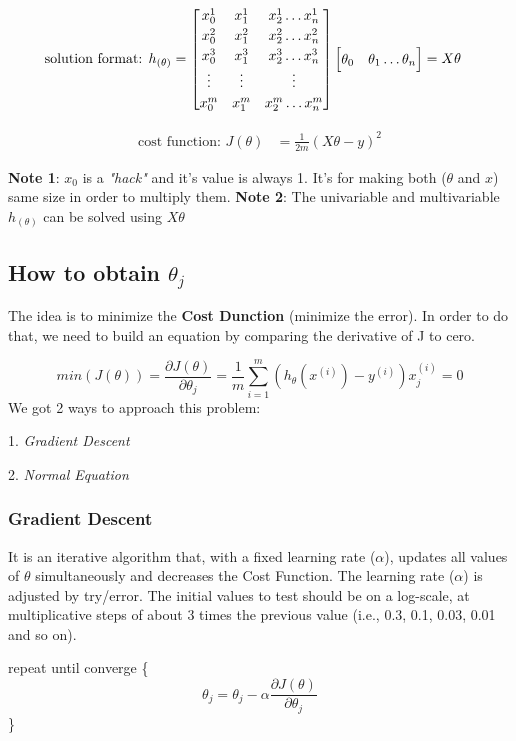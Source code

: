 \begin{align}
	\text{solution format: } h_{(\theta)} & = 
	\renewcommand\arraystretch{1.2}\begin{bmatrix}
			x_0^1 & x_1^1 & x_2^1 \hdots x_n^1 \\
			x_0^2 & x_1^2 & x_2^2 \hdots x_n^2 \\
			x_0^3 & x_1^3 & x_2^3 \hdots x_n^3 \\
			\vdots & \vdots & \vdots \\
			x_0^m & x_1^m & x_2^m \hdots x_n^m \\
		\end{bmatrix}
	\begin{bmatrix} \theta_0 & \theta_1 \hdots \theta_n \end{bmatrix} = X\theta
\end{align}

\begin{align}
	\text{cost function: } J(\theta) & = \frac{1}{2m}(X\theta - y)^2
\end{align}

\justify
\textbf{Note 1}: $x_0$ is a \textit{"hack"} and it's value is always 1. It's for making both ($\theta$ and $x$) same size in order to multiply them.
\justify
\textbf{Note 2}: The univariable and multivariable $h_{(\theta)}$ can be solved using $X\theta$


\subsection{How to obtain $\theta_{j}$}
The idea is to minimize the \textbf{Cost Dunction} (minimize the error). In order to do that, we need to build an equation by comparing the derivative of J to cero.

$$min(J(\theta)) = \frac{\partial{J(\theta)}}{\partial{\theta_{j}}} = \frac{1}{m}\sum_{i=1}^{m} (h_{\theta}(x^{(i)}) - y^{(i)})x_{j}^{(i)} = 0$$
We got 2 ways to approach this problem:


1. \textit{Gradient Descent}

2. \textit{Normal Equation}

\subsubsection{Gradient Descent}
It is an iterative algorithm that, with a fixed learning rate ($\alpha$), updates all values of $\theta$ simultaneously and decreases the Cost Function.
The learning rate ($\alpha$) is adjusted by try/error. The initial values to test should be on a log-scale, at multiplicative
steps of about 3 times the previous value (i.e., 0.3, 0.1, 0.03, 0.01 and so on).
\par
\begin{center}
repeat until converge \{
	$$\theta_{j} = \theta_{j} - \alpha \frac{\partial{J(\theta)}}{\partial{\theta_j}}$$
\}
\end{center}

